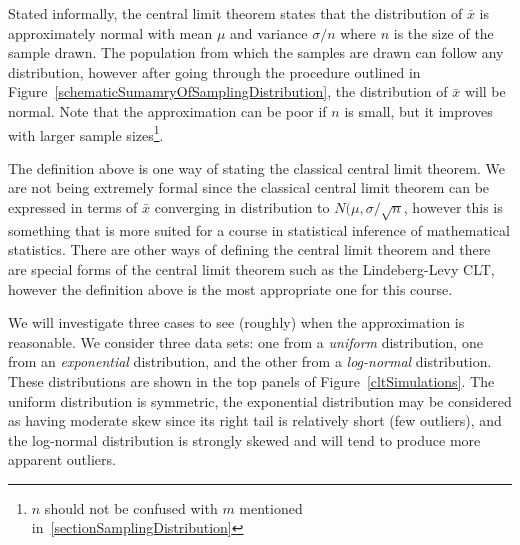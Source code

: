 Stated informally, the central limit theorem states that the distribution of $\bar{x}$ is approximately normal
with mean $\mu$ and variance $\sigma/n$ where $n$ is the size of the sample drawn. 
The population from which the samples are drawn can follow any distribution, however after
going through the procedure outlined in Figure~\ref{schematicSumamryOfSamplingDistribution},
the distribution of $\bar{x}$ will be normal.
Note that the approximation can be poor if %
$n$ is small, but it improves with larger sample sizes\footnote{$n$ should not be confused with $m$ mentioned in~\ref{sectionSamplingDistribution}}.

The definition above is one way of stating the classical central limit theorem. 
We are not being extremely formal since the classical central limit theorem can be expressed 
in terms of $\bar{x}$ converging in distribution to $N(\mu, \sigma/\sqrt{n}$, however this
is something that is more suited for a course in statistical inference of mathematical statistics.
There are other ways of defining the central limit theorem and there are special forms of the central limit theorem such as the Lindeberg-Levy CLT, however the definition above is the most appropriate one for this course.

We will investigate three cases to see (roughly) when the approximation is reasonable.
We consider three data sets: one from a \emph{uniform} distribution, one from an \emph{exponential} distribution, and the other from a \emph{log-normal} distribution. These distributions are shown in the top panels of Figure~\ref{cltSimulations}. The uniform distribution is symmetric, the exponential distribution may be considered as having moderate skew since its right tail is relatively short (few outliers), and the log-normal distribution is strongly skewed and will tend to produce more apparent outliers.


